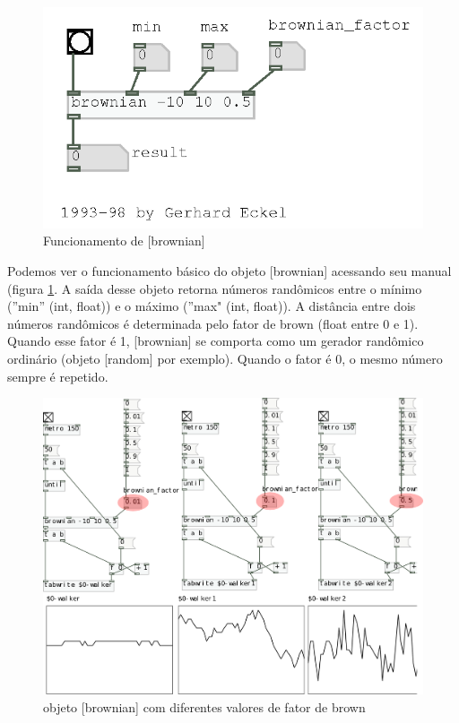 \documentclass{ppgmus}
\begin{document}
 \begin{figure}
\includegraphics[scale=.6]{brownian-func}
\caption{Funcionamento de [brownian]}
\label{brownian-func}
\end{figure} 

Podemos ver o funcionamento básico do objeto [brownian] acessando seu
manual (figura \ref{brownian-func}.  A saída desse objeto retorna números randômicos entre o mínimo
(''min'' (int, float)) e o máximo (''max" (int, float)). A distância entre
dois números randômicos é determinada pelo fator de brown (float
entre 0 e 1). Quando esse fator é 1, [brownian] se comporta como um
gerador randômico ordinário (objeto [random] por exemplo). Quando
o fator é 0, o mesmo número sempre é repetido.


\begin{figure}
\includegraphics[scale=.6]{brownian-exemplo}
\caption{objeto [brownian] com diferentes valores de fator de brown}
\label{brownian-exemplo}
\end{figure} 
\end{document}
